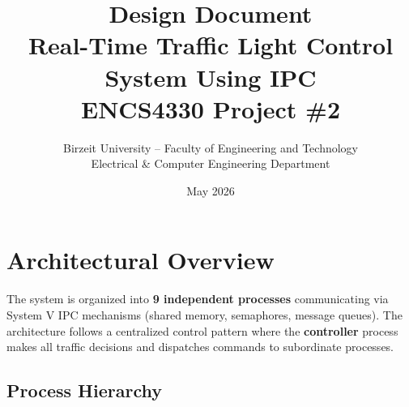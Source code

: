 \documentclass[11pt,a4paper]{article}
\title{\textbf{Design Document} \\
\large Real-Time Traffic Light Control System Using IPC \\
ENCS4330 Project \#2}
\author{Birzeit University -- Faculty of Engineering and Technology \\
Electrical \& Computer Engineering Department}
\date{May 2026}
\begin{document}
\maketitle
\tableofcontents
\newpage

\section{Architectural Overview}

The system is organized into \textbf{9 independent processes} communicating via System V IPC mechanisms (shared memory, semaphores, message queues). The architecture follows a centralized control pattern where the \textbf{controller} process makes all traffic decisions and dispatches commands to subordinate processes.

\subsection{Process Hierarchy}
\end{document}
